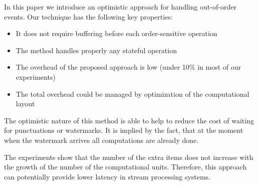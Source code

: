 
\label {fs-conclusion}

In this paper we introduce an optimistic approach for handling out-of-order events. Our technique has the following key properties:

\begin{itemize}
    \item It does not require buffering before each order-sensitive operation
    \item The method handles properly any stateful operation
    \item The overhead of the proposed approach is low (under 10\% in most of our experiments)
    \item The total overhead could be managed by optimization of the computational layout
\end{itemize}

The optimistic nature of this method is able to help to reduce the cost of waiting for punctuations or watermarks. It is implied by the fact, that at the moment when the watermark arrives all computations are already done. 

The experiments show that the number of the extra items does not increase with the growth of the number of the computational units. Therefore, this approach can potentially provide lower latency in stream processing systems.
